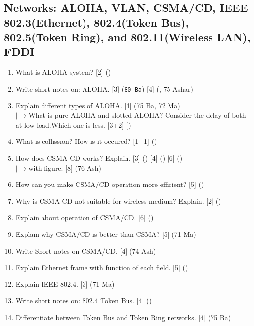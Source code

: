 \documentclass[12pt]{article}
\newcommand{\lb}{\\$\left|\rightarrow\right.$}
\begin{document}
	\subsection{Networks: ALOHA, VLAN, CSMA/CD, IEEE 802.3(Ethernet), 802.4(Token Bus), 802.5(Token Ring), and 802.11(Wireless LAN), FDDI}
		\begin{enumerate}[noitemsep, topsep=0pt]
			\item What is ALOHA system? \hfill [2] ()

			\item Write short notes on: ALOHA. \hfill [3] (\texttt{80 Ba}) [4] (, 75 Ashar)
			
			\item Explain different types of ALOHA. \hfill [4] (75 Ba, 72 Ma)
			\lb What is pure ALOHA and slotted ALOHA? Consider the delay of both at low load.Which one is less. \hfill [3+2] ()
			
			\item What is collission? How is it occured? \hfill [1+1] ()

			\item How does CSMA-CD works? Explain. \hfill [3] () [4] () [6] ()
			\lb with figure. \hfill [8] (76 Ash)

			\item How can you make CSMA/CD operation more efficient? \hfill [5] ()

			\item Why is CSMA-CD not suitable for wireless medium? Explain. \hfill [2] ()

			\item Explain about operation of CSMA/CD. \hfill [6] ()
			
			\item Explain why CSMA/CD is better than CSMA? \hfill[5] (71 Ma)

			\item Write Short notes on CSMA/CD. \hfill [4] (74 Ash)
			
			\item Explain Ethernet frame with function of each field. \hfill [5] ()

			\item Explain IEEE 802.4. \hfill [3] (71 Ma)

			\item Write short notes on: 802.4 Token Bus. \hfill [4] ()

			\item Differentiate between Token Bus and Token Ring networks. \hfill [4] (75 Ba)


\end{enumerate}
\end{document}
